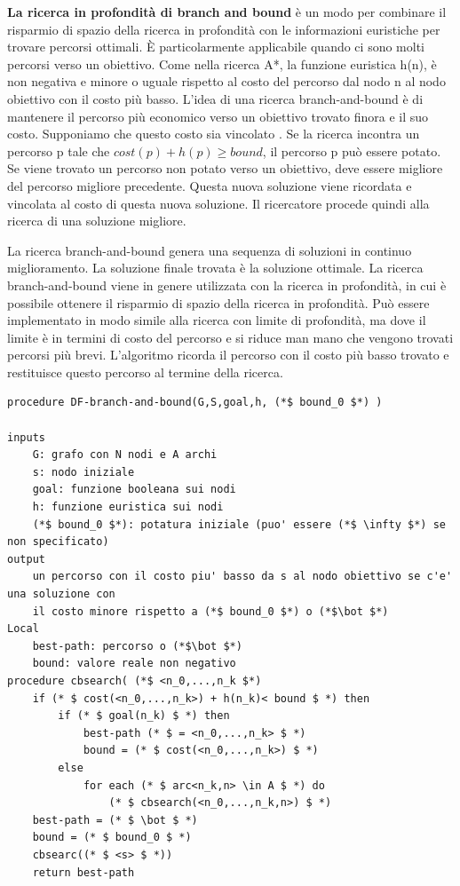 \documentclass[a4paper]{extarticle}
\begin{document}
\textbf{La ricerca in profondità di branch and bound} è un modo per combinare il risparmio di spazio della ricerca in profondità con le informazioni euristiche per trovare percorsi ottimali. È particolarmente applicabile quando ci sono molti percorsi verso un obiettivo. Come nella ricerca A*, la funzione euristica h(n), è non negativa e minore o uguale rispetto al costo del percorso dal nodo n al nodo obiettivo con il costo più basso. L'idea di una ricerca branch-and-bound è di mantenere il percorso più economico verso un obiettivo trovato finora e il suo costo. Supponiamo che questo costo sia vincolato . Se la ricerca incontra un percorso p tale che $cost(p)+h(p) \geq bound$, il percorso p può essere potato. Se viene trovato un percorso non potato verso un obiettivo, deve essere migliore del percorso migliore precedente. Questa nuova soluzione viene ricordata e vincolata al costo di questa nuova soluzione. Il ricercatore procede quindi alla ricerca di una soluzione migliore.

La ricerca branch-and-bound genera una sequenza di soluzioni in continuo miglioramento. La soluzione finale trovata è la soluzione ottimale. La ricerca branch-and-bound viene in genere utilizzata con la ricerca in profondità, in cui è possibile ottenere il risparmio di spazio della ricerca in profondità. Può essere implementato in modo simile alla ricerca con limite di profondità, ma dove il limite è in termini di costo del percorso e si riduce man mano che vengono trovati percorsi più brevi. L'algoritmo ricorda il percorso con il costo più basso trovato e restituisce questo percorso al termine della ricerca.

\begin{lstlisting}
procedure DF-branch-and-bound(G,S,goal,h, (*$ bound_0 $*) )

inputs
	G: grafo con N nodi e A archi
	s: nodo iniziale
	goal: funzione booleana sui nodi
	h: funzione euristica sui nodi
	(*$ bound_0 $*): potatura iniziale (puo' essere (*$ \infty $*) se non specificato)
output
	un percorso con il costo piu' basso da s al nodo obiettivo se c'e' una soluzione con 
	il costo minore rispetto a (*$ bound_0 $*) o (*$\bot $*) 
Local
	best-path: percorso o (*$\bot $*)
	bound: valore reale non negativo
procedure cbsearch( (*$ <n_0,...,n_k $*)
	if (* $ cost(<n_0,...,n_k>) + h(n_k)< bound $ *) then
		if (* $ goal(n_k) $ *) then
			best-path (* $ = <n_0,...,n_k> $ *)
			bound = (* $ cost(<n_0,...,n_k>) $ *)
		else
			for each (* $ arc<n_k,n> \in A $ *) do
				(* $ cbsearch(<n_0,...,n_k,n>) $ *)
	best-path = (* $ \bot $ *)
	bound = (* $ bound_0 $ *)
	cbsearc((* $ <s> $ *))
	return best-path
\end{lstlisting}
\end{document}

